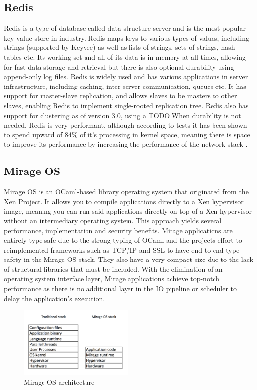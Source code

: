 \documentclass[english,10pt,twocolumn]{article}
\begin{document}
\subsection{Redis}

Redis is a type of database called data structure server and is the most popular key-value store in industry\cite{dbengines}.
Redis maps keys to various types of values, including strings (supported by Keyvee) as well as lists of strings, sets of strings, hash tables etc.
Its working set and all of its data is in-memory at all times, allowing for fast data storage and retrieval but there is also optional durability using append-only log files.
Redis is widely used and has various applications in server infrastructure, including caching, inter-server communication, queues etc.
It has support for master-slave replication, and allows slaves to be masters to other slaves, enabling Redis to implement single-rooted replication tree.
Redis also has support for clustering as of version 3.0, using a TODO
When durability is not needed, Redis is very performant, although according to tests it has been shown to spend upward of 84\% of it's processing in kernel space, meaning there is space to improve its performance by increasing the performance of the network stack \cite{latency}.


\subsection{Mirage OS}

Mirage OS is an OCaml-based library operating system that originated from the Xen Project. It allows you to compile applications directly to a Xen hypervisor image, meaning you can run said applications directly on top of a Xen hypervisor without an intermediary operating system.
This approach yields several performance, implementation and security benefits.
Mirage applications are entirely type-safe due to the strong typing of OCaml and the projects effort to reimplemented frameworks such as TCP/IP and SSL to have end-to-end type safety in the Mirage OS stack. They also have a very compact size due to the lack of structural libraries that must be included.
With the elimination of an operating system interface layer, Mirage applications achieve top-notch performance as there is no additional layer in the IO pipeline or scheduler to delay the application's execution.

\begin{figure}[ht]
  \centering
  \caption{Mirage OS architecture}
  \includegraphics[width=0.5\textwidth]{images/design}
\end{figure}
\end{document}
